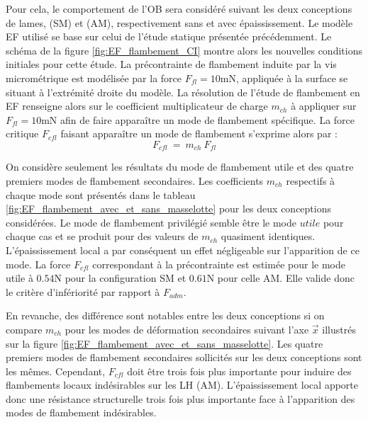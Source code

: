 Pour cela, le comportement de l'OB sera considéré suivant les deux conceptions de lames, (SM) et (AM), respectivement sans et avec épaississement. Le modèle EF utilisé se base sur celui de l'étude statique présentée précédemment. Le schéma de la figure \ref{fig:EF_flambement_CI} montre alors les nouvelles conditions initiales pour cette étude. La précontrainte de flambement induite par la vis micrométrique est modélisée par la force $F_{fl}=10$mN, appliquée à la surface se situant à l'extrémité droite du modèle. La résolution de l'étude de flambement en EF renseigne alors sur le coefficient multiplicateur de charge $m_{ch}$ à appliquer sur $F_{fl}=10$mN afin de faire apparaître un mode de flambement spécifique. La force critique $F_{cfl}$ faisant apparaître un mode de flambement s'exprime alors par :
\begin{equation}
	F_{cfl}\ =\ m_{ch}\ F_{fl}
\label{eq:Force flambement EF}
\end{equation}

On considère seulement les résultats du mode de flambement utile et des quatre premiers modes de flambement secondaires. Les coefficients $m_{ch}$ respectifs à chaque mode sont présentés dans le tableau \ref{fig:EF_flambement_avec_et_sans_masselotte} pour les deux conceptions considérées. Le mode de flambement privilégié semble être le mode $utile$ pour chaque cas et se produit pour des valeurs de $m_{ch}$ quasiment identiques. L'épaississement local a par conséquent un effet négligeable sur l'apparition de ce mode. La force $F_{cfl}$ correspondant à la précontrainte est estimée pour le mode utile à $0.54$N pour la configuration SM et $0.61$N pour celle AM. Elle valide donc le critère d'infériorité par rapport à $F_{adm}$.	

En revanche, des différence sont notables entre les deux conceptions si on compare  $m_{ch}$ pour les modes de déformation secondaires suivant l'axe $\vec{x}$ illustrés sur la figure \ref{fig:EF_flambement_avec_et_sans_masselotte}. Les quatre premiers modes de flambement secondaires sollicités sur les deux conceptions sont les mêmes. Cependant, $F_{cfl}$ doit être trois fois plus importante pour induire des flambements locaux indésirables sur les LH (AM). L'épaississement local apporte donc une résistance structurelle trois fois plus importante face à l'apparition des modes de flambement indésirables. 

